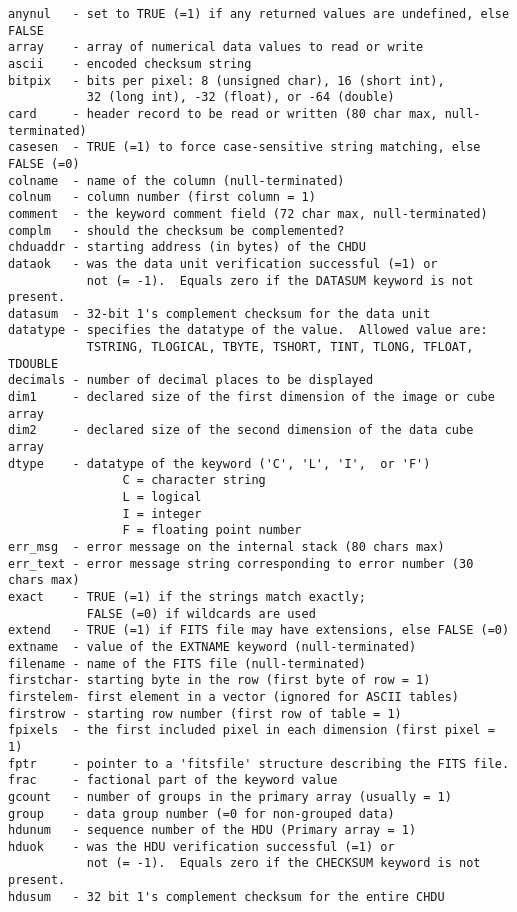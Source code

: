 \begin{verbatim}
anynul   - set to TRUE (=1) if any returned values are undefined, else FALSE
array    - array of numerical data values to read or write
ascii    - encoded checksum string
bitpix   - bits per pixel: 8 (unsigned char), 16 (short int),
           32 (long int), -32 (float), or -64 (double)
card     - header record to be read or written (80 char max, null-terminated)
casesen  - TRUE (=1) to force case-sensitive string matching, else FALSE (=0)
colname  - name of the column (null-terminated)
colnum   - column number (first column = 1)
comment  - the keyword comment field (72 char max, null-terminated)
complm   - should the checksum be complemented?
chduaddr - starting address (in bytes) of the CHDU
dataok   - was the data unit verification successful (=1) or
           not (= -1).  Equals zero if the DATASUM keyword is not present.
datasum  - 32-bit 1's complement checksum for the data unit
datatype - specifies the datatype of the value.  Allowed value are:
           TSTRING, TLOGICAL, TBYTE, TSHORT, TINT, TLONG, TFLOAT, TDOUBLE
decimals - number of decimal places to be displayed
dim1     - declared size of the first dimension of the image or cube array
dim2     - declared size of the second dimension of the data cube array
dtype    - datatype of the keyword ('C', 'L', 'I',  or 'F')
                C = character string
                L = logical
                I = integer
                F = floating point number
err_msg  - error message on the internal stack (80 chars max)
err_text - error message string corresponding to error number (30 chars max)
exact    - TRUE (=1) if the strings match exactly;
           FALSE (=0) if wildcards are used
extend   - TRUE (=1) if FITS file may have extensions, else FALSE (=0)
extname  - value of the EXTNAME keyword (null-terminated)
filename - name of the FITS file (null-terminated)
firstchar- starting byte in the row (first byte of row = 1)
firstelem- first element in a vector (ignored for ASCII tables)
firstrow - starting row number (first row of table = 1)
fpixels  - the first included pixel in each dimension (first pixel = 1)
fptr     - pointer to a 'fitsfile' structure describing the FITS file.
frac     - factional part of the keyword value
gcount   - number of groups in the primary array (usually = 1)
group    - data group number (=0 for non-grouped data)
hdunum   - sequence number of the HDU (Primary array = 1)
hduok    - was the HDU verification successful (=1) or
           not (= -1).  Equals zero if the CHECKSUM keyword is not present.
hdusum   - 32 bit 1's complement checksum for the entire CHDU

\end{verbatim}
